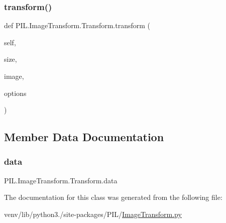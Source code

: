 \mbox{\label{classPIL_1_1ImageTransform_1_1Transform_ac0b352a6d2d2f6f05c8bd44c19478d3c}} 
\subsubsection{\texorpdfstring{transform()}{transform()}}
{\footnotesize\ttfamily def P\+I\+L.\+Image\+Transform.\+Transform.\+transform (\begin{DoxyParamCaption}\item[{}]{self,  }\item[{}]{size,  }\item[{}]{image,  }\item[{}]{options }\end{DoxyParamCaption})}



\subsection{Member Data Documentation}
\mbox{\label{classPIL_1_1ImageTransform_1_1Transform_a953d81d52179df7ed0d2a55268d83207}} 
\subsubsection{\texorpdfstring{data}{data}}
{\footnotesize\ttfamily P\+I\+L.\+Image\+Transform.\+Transform.\+data}



The documentation for this class was generated from the following file\+:\begin{DoxyCompactItemize}
\item 
venv/lib/python3./site-\/packages/\+P\+I\+L/\hyperlink{ImageTransform_8py}{Image\+Transform.\+py}\end{DoxyCompactItemize}
